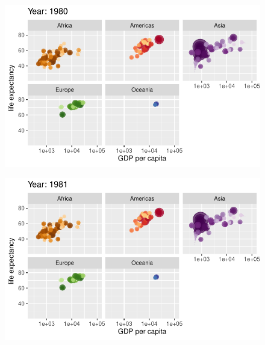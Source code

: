 \documentclass[
  letterpaper,
  DIV=11,
  numbers=noendperiod]{scrartcl}
\begin{document}
\begin{figure}[H]

{\centering \includegraphics{class05_files/figure-pdf/unnamed-chunk-24-52.pdf}

}

\end{figure}

\begin{figure}[H]

{\centering \includegraphics{class05_files/figure-pdf/unnamed-chunk-24-53.pdf}

}

\end{figure}
\end{document}
